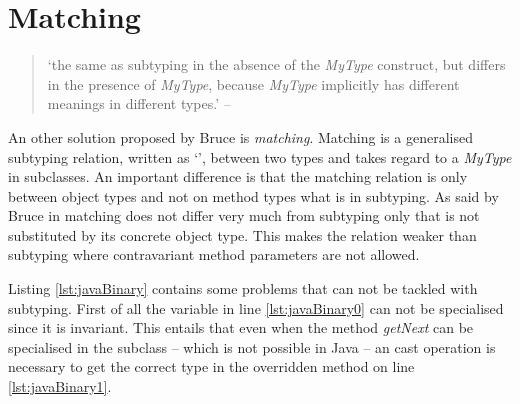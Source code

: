 %
%

\section{Matching}
\begin{quotation}
`the same as subtyping in the absence of the \emph{MyType}
construct, but differs in the presence of \emph{MyType}, because
\emph{MyType} implicitly has different meanings in different types.' --
\cite{bruce_foundations_2002}
\end{quotation}

An other solution proposed by Bruce \cite{bruce_binary_1995} is
\emph{matching}. Matching is a generalised subtyping relation, written
as `\match', between two types and takes regard to a \emph{MyType} in
subclasses. An important difference is that the matching relation is only
between object types and not on method types what is in subtyping. As
said by Bruce in \cite{bruce_foundations_2002} matching does not differ
very much from subtyping only that \mytype is not substituted by its
concrete object type. This makes the relation weaker than subtyping
where contravariant method parameters are not allowed.

Listing \ref{lst:javaBinary} contains some problems that can not be tackled
with subtyping. First of all the variable in line \ref{lst:javaBinary0} can
not be specialised since it is invariant. This entails that even when the 
method \emph{getNext} can be specialised in the subclass -- which is not possible
in Java -- an cast operation is necessary to get the correct type in the overridden 
method on line \ref{lst:javaBinary1}.

